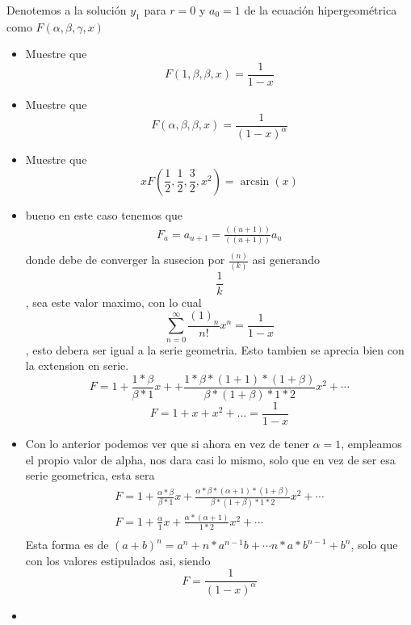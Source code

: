 \begin{prob}
Denotemos a la solución $y_1$ para $r = 0$ y $a_0 = 1$ de la ecuación hipergeométrica como $F (\alpha, \beta, \gamma, x)$
\begin{itemize}
    \item {Muestre que 
    $$F (1, \beta, \beta, x)= \frac{1}{1-x} $$
    }
    \item {Muestre que 
    $$F (\alpha, \beta, \beta, x)=\frac{1}{(1-x)^{\alpha}}  $$
    }
    \item {Muestre que 
    $$ xF (\frac{1}{2}, \frac{1}{2}, \frac{3}{2}, x^2)={\arcsin(x)}$$
    }
\end{itemize}

\end{prob}
\begin{mdframed}
    \begin{itemize}
        \item {
            bueno en este caso tenemos que
            \begin{gather*}
                F_a = a_{u+1}= \frac{(({u+1}))}{(({u+1}))}a_u\\
            \end{gather*}
            donde debe de converger la susecion por $\frac{(n)}{(k)}$ asi generando
            $$\frac{1}{k}$$, sea este valor maximo, con lo cual 
            $$\sum_{n=0}^{\infty}\frac{(1)_n}{n!}x^n = \frac{1}{1-x}$$, esto debera ser igual a la serie geometria. Esto tambien se aprecia bien con la extension en serie.
            $$F = 1+\frac{1*\beta}{\beta*1}x++\frac{1*\beta*(1+1)*(1+\beta)}{\beta*(1+\beta)*1*2}x^2+\cdots$$
            $$F = 1+x+x^2+...= \frac{1}{1-x}$$
        }
        \item {
            Con lo anterior podemos ver que si ahora en vez de tener $\alpha =1$, empleamos el propio valor de alpha, nos dara casi lo mismo, solo que en vez de ser esa serie geometrica, esta sera
            \begin{gather*}
                F = 1+\frac{\alpha*\beta}{\beta*1}x+\frac{\alpha*\beta*(\alpha+1)*(1+\beta)}{\beta*(1+\beta)*1*2}x^2+\cdots\\
                F = 1+\frac{\alpha}{1}x+\frac{\alpha*(\alpha+1)}{1*2}x^2+\cdots\\
            \end{gather*}
            Esta forma es de $(a+b)^n =a^n+n*a^{n-1}b+\cdots n*a*b^{n-1}+b^n$, solo que con los valores estipulados asi, siendo
            $$F = \frac{1}{(1-x)^{\alpha}}$$
        }
        \item {
}
\end{itemize}
\end{mdframed}
